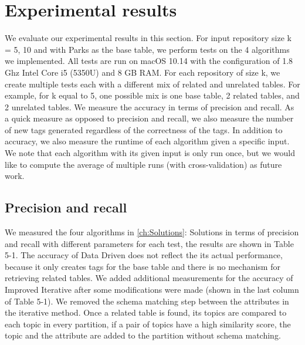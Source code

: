 \section{Experimental results}
\label{sec:ExperimentalResults}

We evaluate our experimental results in this section. For input repository size k = 5, 10 and with Parks as the base table, we perform tests on the 4 algorithms we implemented. All tests are run on macOS 10.14 with the configuration of 1.8 Ghz Intel Core i5 (5350U) and 8 GB RAM. For each repository of size k, we create multiple tests each with a different mix of related and unrelated tables. For example, for k equal to 5, one possible mix is one base table, 2 related tables, and 2 unrelated tables. We measure the accuracy in terms of precision and recall. As a quick measure as opposed to precision and recall, we also measure the number of new tags generated regardless of the correctness of the tags. In addition to accuracy, we also measure the runtime of each algorithm given a specific input. We note that each algorithm with its given input is only run once, but we would like to compute the average of multiple runs (with cross-validation) as future work.

\subsection{Precision and recall}

We measured the four algorithms in \autoref{ch:Solutions}: Solutions in terms of precision and recall with different parameters for each test, the results are shown in Table 5-1. The accuracy of Data Driven does not reflect the its actual performance, because it only creates tags for the base table and there is no mechanism for retrieving related tables. We added additional measurements for the accuracy of Improved Iterative after some modifications were made (shown in the last column of Table 5-1). We removed the schema matching step between the attributes in the iterative method. Once a related table is found, its topics are compared to each topic in every partition, if a pair of topics have a high similarity score, the topic and the attribute are added to the partition without schema matching.

